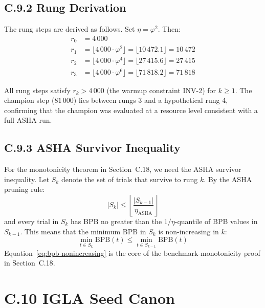 \subsection*{C.9.2 Rung Derivation}

The rung steps are derived as follows.  Set $\eta = \varphi^2$.  Then:
\begin{align}
r_0 &= 4\,000 \label{eq:rung0}\\
r_1 &= \lfloor 4\,000 \cdot \varphi^2 \rfloor = \lfloor 10\,472.1 \rfloor
       = 10\,472 \label{eq:rung1}\\
r_2 &= \lfloor 4\,000 \cdot \varphi^4 \rfloor = \lfloor 27\,415.6 \rfloor
       = 27\,415 \label{eq:rung2}\\
r_3 &= \lfloor 4\,000 \cdot \varphi^6 \rfloor = \lfloor 71\,818.2 \rfloor
       = 71\,818 \label{eq:rung3}
\end{align}

All rung steps satisfy $r_k > 4\,000$ (the warmup constraint INV-2)
for $k \geq 1$.  The champion step ($81\,000$) lies between rungs 3
and a hypothetical rung 4, confirming that the champion was evaluated
at a resource level consistent with a full ASHA run.

\subsection*{C.9.3 ASHA Survivor Inequality}

For the monotonicity theorem in Section~C.18, we need the ASHA survivor
inequality.  Let $S_k$ denote the set of trials that survive to rung
$k$.  By the ASHA pruning rule:
\begin{equation}
|S_k| \leq \left\lfloor \frac{|S_{k-1}|}{\eta_{\text{ASHA}}} \right\rfloor
\label{eq:asha-survivor}
\end{equation}
and every trial in $S_k$ has BPB no greater than the $1/\eta$-quantile
of BPB values in $S_{k-1}$.  This means that the minimum BPB in $S_k$
is non-increasing in $k$:
\begin{equation}
\min_{t \in S_k} \text{BPB}(t) \leq \min_{t \in S_{k-1}} \text{BPB}(t)
\label{eq:bpb-nonincreasing}
\end{equation}
Equation~\eqref{eq:bpb-nonincreasing} is the core of the
benchmark-monotonicity proof in Section~C.18.

\section*{C.10 IGLA Seed Canon}
\label{sec:seed-canon}

